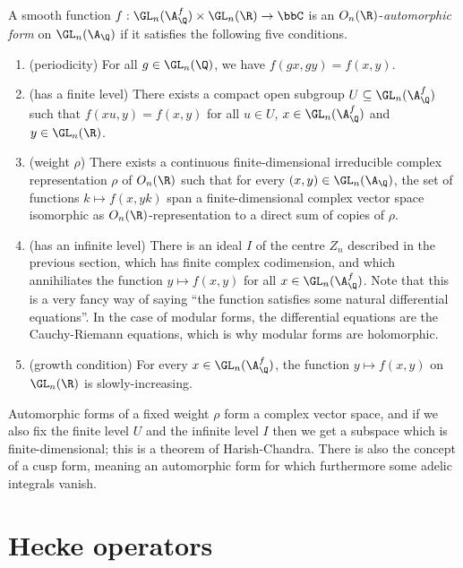 \begin{definition}
  \label{AutomorphicForm.GLn.AutomorphicFormForGLnOverQ}
  A smooth function $f:\GL_n(\A_{\Q}^f)\times\GL_n(\R)\to\bbC$ is
  an $O_n(\R)$-\emph{automorphic form} on $\GL_n(\A_{\Q})$ if it satisfies the following
  five conditions.
  \begin{enumerate}
    \item (periodicity) For all $g\in\GL_n(\Q)$, we have $f(gx,gy)=f(x,y)$.
    \item (has a finite level) There exists a compact open subgroup $U\subseteq\GL_n(\A_{\Q}^f)$
      such that $f(xu,y)=f(x,y)$ for all $u\in U$, $x\in \GL_n(\A_{\Q}^f)$ and $y\in\GL_n(\R)$.
    \item (weight $\rho$) There exists a continuous finite-dimensional irreducible complex
    representation $\rho$ of $O_n(\R)$ such that for every $(x,y)\in\GL_n(\A_{\Q})$, the
    set of functions $k\mapsto f(x,yk)$ span a finite-dimensional complex vector space isomorphic
    as $O_n(\R)$-representation to a direct sum of copies of $\rho$.
    \item (has an infinite level) There is an ideal $I$ of the centre $Z_n$ described in the
    previous section, which has finite complex codimension, and which annihiliates the
    function $y \mapsto f(x,y)$ for all $x\in \GL_n(\A_{\Q}^f)$. Note that this is a very fancy
    way of saying ``the function satisfies some natural differential equations''. In the
    case of modular forms, the differential equations are the Cauchy-Riemann equations, which
    is why modular forms are holomorphic.
    \item (growth condition) For every $x\in\GL_n(\A_{\Q}^f)$, the function $y\mapsto f(x,y)$
  on $\GL_n(\R)$ is slowly-increasing.
  \end{enumerate}

\end{definition}

Automorphic forms of a fixed weight $\rho$ form a complex vector space, and if we also
fix the finite level $U$ and the infinite level $I$ then we get a subspace which is
finite-dimensional; this is a theorem of Harish-Chandra. There is also the concept
of a cusp form, meaning an automorphic form for which furthermore some adelic integrals
vanish.

\section{Hecke operators}

